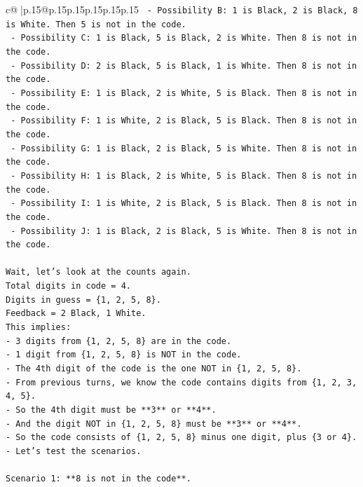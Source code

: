 \documentclass{article}
\begin{document}
{\begin{supertabular}{c@{$\;$}|p{.15\linewidth}@{}p{.15\linewidth}p{.15\linewidth}p{.15\linewidth}p{.15\linewidth}p{.15\linewidth}}
{{{\texttt{  {-} Possibility B: 1 is Black, 2 is Black, 8 is White. Then 5 is not in the code.} \\
\texttt{  {-} Possibility C: 1 is Black, 5 is Black, 2 is White. Then 8 is not in the code.} \\
\texttt{  {-} Possibility D: 2 is Black, 5 is Black, 1 is White. Then 8 is not in the code.} \\
\texttt{  {-} Possibility E: 1 is Black, 2 is White, 5 is Black. Then 8 is not in the code.} \\
\texttt{  {-} Possibility F: 1 is White, 2 is Black, 5 is Black. Then 8 is not in the code.} \\
\texttt{  {-} Possibility G: 1 is Black, 2 is Black, 5 is White. Then 8 is not in the code.} \\
\texttt{  {-} Possibility H: 1 is Black, 2 is White, 5 is Black. Then 8 is not in the code.} \\
\texttt{  {-} Possibility I: 1 is White, 2 is Black, 5 is Black. Then 8 is not in the code.} \\
\texttt{  {-} Possibility J: 1 is Black, 2 is Black, 5 is White. Then 8 is not in the code.} \\
\\ 
\texttt{Wait, let's look at the counts again.} \\
\texttt{Total digits in code = 4.} \\
\texttt{Digits in guess = \{1, 2, 5, 8\}.} \\
\texttt{Feedback = 2 Black, 1 White.} \\
\texttt{This implies:} \\
\texttt{{-} 3 digits from \{1, 2, 5, 8\} are in the code.} \\
\texttt{{-} 1 digit from \{1, 2, 5, 8\} is NOT in the code.} \\
\texttt{{-} The 4th digit of the code is the one NOT in \{1, 2, 5, 8\}.} \\
\texttt{{-} From previous turns, we know the code contains digits from \{1, 2, 3, 4, 5\}.} \\
\texttt{{-} So the 4th digit must be **3** or **4**.} \\
\texttt{{-} And the digit NOT in \{1, 2, 5, 8\} must be **3** or **4**.} \\
\texttt{{-} So the code consists of \{1, 2, 5, 8\} minus one digit, plus \{3 or 4\}.} \\
\texttt{{-} Let's test the scenarios.} \\
\\ 
\texttt{Scenario 1: **8 is not in the code**.} \\
}}}
\end{supertabular}}
\end{document}
